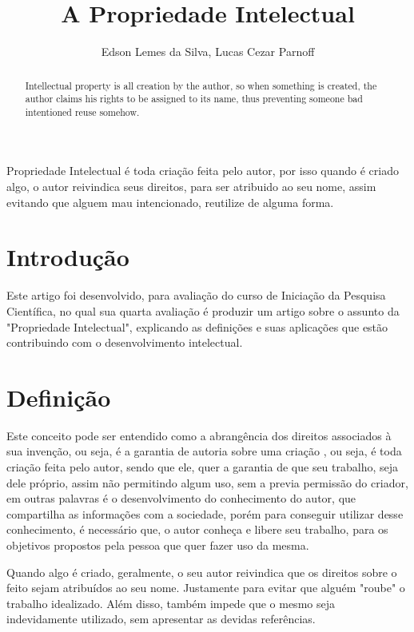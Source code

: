 \documentclass[12pt]{article}
\title{A Propriedade Intelectual}
\author{Edson Lemes da Silva\inst{1}, Lucas Cezar Parnoff\inst{1}  }
\begin{document}
 

\maketitle

\begin{abstract}
  Intellectual property is all creation by the author, so when something is created, the author claims his rights to be assigned to its name, thus preventing someone bad intentioned reuse somehow.
\end{abstract}
     
\begin{resumo} 
  Propriedade Intelectual é toda criação feita pelo autor, por isso quando é criado algo, o autor reivindica seus direitos, para ser atribuido ao seu nome, assim evitando que alguem mau intencionado, reutilize de alguma forma. 
\end{resumo}

\section{Introdução}\label{sec:introducao}

Este artigo foi desenvolvido, para avaliação
do curso de Iniciação da Pesquisa Científica, no qual
sua quarta avaliação é produzir um artigo sobre o assunto da
"Propriedade Intelectual", explicando as definições e
suas aplicações que estão contribuindo com
o desenvolvimento intelectual.

\section{Definição}\label{sec:conteudo}

Este conceito pode ser entendido como a abrangência  dos direitos associados à sua invenção, ou seja, é a garantia de autoria sobre uma criação \cite{UFAL}, ou seja, é toda criação feita pelo autor, sendo que ele, quer a garantia de que seu trabalho, seja dele próprio, assim não permitindo algum uso, sem a previa permissão do criador, em outras palavras é o desenvolvimento do conhecimento do autor, que compartilha as informações com a sociedade, porém para conseguir utilizar desse conhecimento, é necessário que, o autor conheça e libere seu trabalho, para os objetivos propostos pela pessoa que quer fazer uso da mesma. 

Quando algo é criado, geralmente, o seu autor reivindica que os direitos sobre o feito sejam atribuídos ao seu nome. Justamente para evitar que alguém "roube" o trabalho idealizado. Além disso, também impede que o mesmo seja indevidamente utilizado, sem apresentar as devidas referências.
\end{document}
